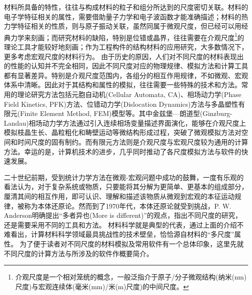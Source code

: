 材料所具备的特性，往往与构成材料的粒子和组分所达到的尺度密切关联。材料的电子学特征相关的属性，需要借助量子力学和电子波函数才能准确描述；材料的热力学特征相关的性质，则与原子振动关联，虽然同属于微观尺度，但已经可以用经典力学来刻画；而研究材料的缺陷，特别是位错或晶界，往往需要在介观尺度\footnote{介观尺度是一个相对笼统的概念，一般泛指介于原子/分子微观结构(纳米\textrm{(nm)}尺度)与宏观连续体(毫米(\textrm{mm})/米\textrm{(m)}尺度)的中间尺度。}的理论工具才能较好地刻画；作为工程构件的结构材料的应用研究，大多数情况下，更多考虑宏观尺度的材料行为。
由于历史的原因，人们对不同尺度的材料表现出的性能的认知并不完全相同，因此不同尺度对应的物理规律、模拟方法和计算工具都有显著差异。特别是介观尺度范围内，各组分的相互作用规律，不如微观、宏观体系中清晰。因此对于其结构和属性的模拟，往往需要一些特殊的技术和方法。常用的理论研究方法包括元胞自动机\textrm{(Cellular Automata, CA)}、相场动力学\textrm{(Phase Field Kinetics, PFK)}方法、位错动力学\textrm{(Dislocation Dynamics)}方法与多晶塑性有限元\textrm{(Finite Element Method, FEM)}模型等。其中金兹堡—朗道型\textrm{(Ginzburg-Landau)}相场动力学方法通过引入连续相场变量描述界面演化，能够在介观尺度上模拟枝晶生长、晶粒粗化和畴壁运动等微结构形成过程，突破了微观模拟方法对空间和时间尺度的固有制约。而有限元方法则是介观尺度与宏观尺度较为通用的计算方法。幸运的是，计算机技术的进步，几乎同时推动了各尺度模拟方法与软件的快速发展。

二十世纪前期，受到统计力学方法在微观-宏观问题中成功的鼓舞，一度有乐观的看法认为，对于复杂系统或物质，只要能将其分解为更简单、更基本的组成部分，厘清其间的相互作用，即可认识、理解和描述该物质从微观到宏观的本征运动规律，被称为本体还原论。然而到了1970年代，本体还原论就受到挑战，\textrm{P. W. Anderson}明确提出``多者异也\textrm{(More is different)}''的观点，指出不同尺度的研究，还是需要采用不同的工具和方法。
材料科学就是典型的代表，通过上面的介绍不难看出，计算材料科学领域最具挑战性的技术壁垒，恰恰源自材料的``多尺度''属性。%
为了便于读者对不同尺度的材料模拟及常用软件有一个总体印象，这里先就不同尺度的计算方法与所涉及的软件作概要简介。

